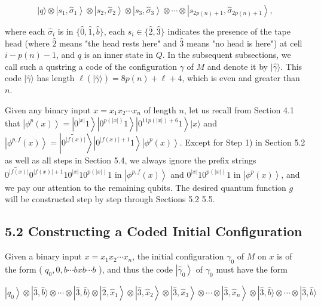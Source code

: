 \documentclass[10pt]{article}
\begin{document}
$$
|q\rangle \otimes\left|s_{1}, \hat{\sigma}_{1}\right\rangle \otimes\left|s_{2}, \hat{\sigma}_{2}\right\rangle \otimes\left|s_{3}, \hat{\sigma}_{3}\right\rangle \otimes \cdots \otimes\left|s_{2 p(n)+1}, \hat{\sigma}_{2 p(n)+1}\right\rangle,
$$

where each $\hat{\sigma}_{i}$ is in $\{\hat{0}, \hat{1}, \hat{b}\}$, each $s_{i} \in\{\hat{2}, \hat{3}\}$ indicates the presence of the tape head (where $\hat{2}$ means "the head rests here" and $\hat{3}$ means "no head is here") at cell $i-p(n)-1$, and $q$ is an inner state in $Q$. In the subsequent subsections, we call such a qustring a code of the configuration $\gamma$ of $M$ and denote it by $|\hat{\gamma}\rangle$. This code $|\hat{\gamma}\rangle$ has length $\ell(|\hat{\gamma}\rangle)=8 p(n)+\ell+4$, which is even and greater than $n$.

Given any binary input $x=x_{1} x_{2} \cdots x_{n}$ of length $n$, let us recall from Section 4.1 that $\left|\phi^{p}(x)\right\rangle= \left|0^{|x|} 1\right\rangle\left|0^{p(|x|)} 1\right\rangle\left|0^{11 p(|x|)+6} 1\right\rangle|x\rangle$ and $\left|\phi^{p, f}(x)\right\rangle=\left|\widetilde{0^{|f(x)|}}\right\rangle\left|0^{|f(x)|+1} 1\right\rangle\left|\phi^{p}(x)\right\rangle$. Except for Step 1) in Section 5.2 as well as all steps in Section 5.4, we always ignore the prefix strings $\widetilde{0^{|f(x)|}} 0^{|f(x)|+1} 10^{|x|} 10^{p(|x|)} 1$ in $\left|\phi^{p, f}(x)\right\rangle$ and $0^{|x|} 10^{p(|x|)} 1$ in $\left|\phi^{p}(x)\right\rangle$, and we pay our attention to the remaining qubits. The desired quantum function $g$ will be constructed step by step through Sections 5.2 5.5.

\subsection*{5.2 Constructing a Coded Initial Configuration}
Given a binary input $x=x_{1} x_{2} \cdots x_{n}$, the initial configuration $\gamma_{0}$ of $M$ on $x$ is of the form ( $q_{0}, 0, b \cdots b x b \cdots b$ ), and thus the code $\left|\hat{\gamma}_{0}\right\rangle$ of $\gamma_{0}$ must have the form

$$
\left|q_{0}\right\rangle \otimes|\hat{3}, \hat{b}\rangle \otimes \cdots \otimes|\hat{3}, \hat{b}\rangle \otimes\left|\hat{2}, \hat{x}_{1}\right\rangle \otimes\left|\hat{3}, \hat{x}_{2}\right\rangle \otimes\left|\hat{3}, \hat{x}_{3}\right\rangle \otimes \cdots \otimes\left|\hat{3}, \hat{x}_{n}\right\rangle \otimes|\hat{3}, \hat{b}\rangle \otimes \cdots \otimes|\hat{3}, \hat{b}\rangle
$$
\end{document}
